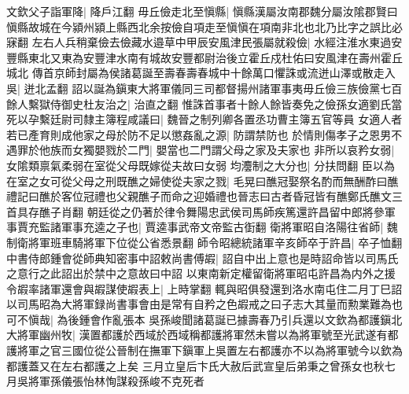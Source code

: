 文欽父子詣軍降|{
	降戶江翻}
毋丘儉走北至愼縣|{
	愼縣漢屬汝南郡魏分屬汝隂郡賢曰愼縣故城在今潁州潁上縣西北余按儉自項走至愼愼在項南非北也北乃比字之誤比必寐翻}
左右人兵稍棄儉去儉藏水邉草中甲辰安風津民張屬就殺儉|{
	水經注淮水東過安豐縣東北又東為安豐津水南有城故安豐都尉治後立霍丘戍杜佑曰安風津在壽州霍丘城北}
傳首京師封屬為侯諸葛誕至壽春壽春城中十餘萬口懼誅或流迸山澤或散走入吳|{
	迸北孟翻}
詔以誕為鎭東大將軍儀同三司都督揚州諸軍事夷毋丘儉三族儉黨七百餘人繫獄侍御史杜友治之|{
	治直之翻}
惟誅首事者十餘人餘皆奏免之儉孫女適劉氏當死以孕繫廷尉司隸主簿程咸議曰|{
	魏晉之制列卿各置丞功曹主簿五官等員}
女適人者若已產育則成他家之母於防不足以懲姦亂之源|{
	防謂禁防也}
於情則傷孝子之恩男不遇罪於他族而女獨嬰戮於二門|{
	嬰當也二門謂父母之家及夫家也}
非所以哀矜女弱|{
	女隂類禀氣柔弱在室從父母既嫁從夫故曰女弱}
均灋制之大分也|{
	分扶問翻}
臣以為在室之女可從父母之刑既醮之婦使從夫家之戮|{
	毛晃曰醮冠娶祭名酌而無酬酢曰醮禮記曰醮於客位冠禮也父親醮子而命之迎婚禮也晉志曰古者昏冠皆有醮鄭氏醮文三首具存醮子肖翻}
朝廷從之仍著於律令舞陽忠武侯司馬師疾篤還許昌留中郎將參軍事賈充監諸軍事充逵之子也|{
	賈逵事武帝文帝監古衘翻}
衛將軍昭自洛陽往省師|{
	魏制衛將軍班車騎將軍下位從公省悉景翻}
師令昭總統諸軍辛亥師卒于許昌|{
	卒子恤翻}
中書侍郎鍾會從師典知密事中詔敕尚書傅嘏|{
	詔自中出上意也是時詔命皆以司馬氏之意行之此詔出於禁中之意故曰中詔}
以東南新定權留衛將軍昭屯許昌為内外之援令嘏率諸軍還會與嘏謀使嘏表上|{
	上時掌翻}
輒與昭俱發還到洛水南屯住二月丁巳詔以司馬昭為大將軍録尚書事會由是常有自矜之色嘏戒之曰子志大其量而勲業難為也可不愼哉|{
	為後鍾會作亂張本}
吳孫峻聞諸葛誕已據壽春乃引兵還以文欽為都護鎭北大將軍幽州牧|{
	漢置都護於西域於西域稱都護將軍然未嘗以為將軍號至光武遂有都護將軍之官三國位從公晉制在撫軍下鎭軍上吳置左右都護亦不以為將軍號今以欽為都護蓋又在左右都護之上矣}
三月立皇后卞氏大赦后武宣皇后弟秉之曾孫女也秋七月吳將軍孫儀張怡林恂謀殺孫峻不克死者

